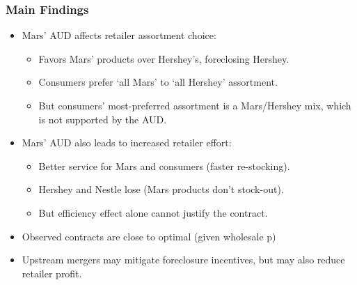 \begin{frame}\frametitle{Main Findings}
\begin{itemize}
\item Mars' AUD affects retailer assortment choice:
	\begin{itemize}
	\item Favors Mars' products over Hershey's, foreclosing Hershey.
	\item Consumers prefer `all Mars' to `all Hershey' assortment.
	\item But consumers' most-preferred assortment is a Mars/Hershey mix, which is not supported by the AUD.
	\end{itemize}
\item Mars' AUD also leads to increased retailer effort:
\begin{itemize}
\item Better service for Mars and consumers (faster re-stocking).
\item Hershey and Nestle lose (Mars products don't stock-out).
\item But efficiency effect alone cannot justify the contract.
\end{itemize}
\item Observed contracts are close to optimal (given wholesale p)
\item Upstream mergers may mitigate foreclosure incentives, but may also reduce retailer profit.
\end{itemize}
\end{frame}


